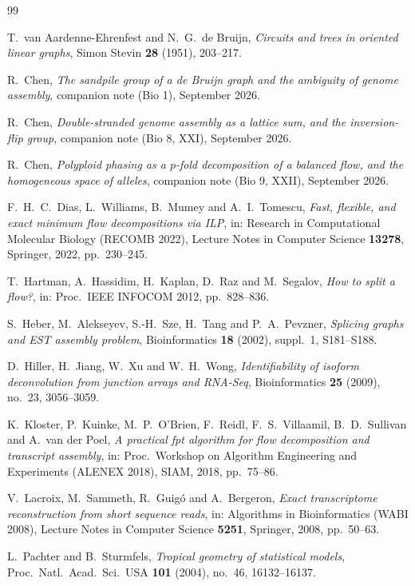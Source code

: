 \documentclass[11pt]{article}
\theoremstyle{plain}
\theoremstyle{definition}
\theoremstyle{remark}
\begin{document}
\begin{thebibliography}{99}

 T.~van Aardenne-Ehrenfest and N.~G.~de Bruijn,
\emph{Circuits and trees in oriented linear graphs},
Simon Stevin \textbf{28} (1951), 203--217.

 R.~Chen, \emph{The sandpile group of a de Bruijn graph and the ambiguity of
genome assembly}, companion note (Bio 1), September 2026.

 R.~Chen, \emph{Double-stranded genome assembly as a lattice sum, and the
inversion-flip group}, companion note (Bio 8, XXI), September 2026.

 R.~Chen, \emph{Polyploid phasing as a $p$-fold decomposition of a balanced
flow, and the homogeneous space of alleles}, companion note (Bio 9, XXII), September 2026.

 F.~H.~C.~Dias, L.~Williams, B.~Mumey and A.~I.~Tomescu,
\emph{Fast, flexible, and exact minimum flow decompositions via ILP},
in: Research in Computational Molecular Biology (RECOMB 2022), Lecture Notes in Computer
Science \textbf{13278}, Springer, 2022, pp.~230--245.

 T.~Hartman, A.~Hassidim, H.~Kaplan, D.~Raz and M.~Segalov,
\emph{How to split a flow?},
in: Proc.\ IEEE INFOCOM 2012, pp.~828--836.

 S.~Heber, M.~Alekseyev, S.-H.~Sze, H.~Tang and P.~A.~Pevzner,
\emph{Splicing graphs and EST assembly problem},
Bioinformatics \textbf{18} (2002), suppl.~1, S181--S188.

 D.~Hiller, H.~Jiang, W.~Xu and W.~H.~Wong,
\emph{Identifiability of isoform deconvolution from junction arrays and RNA-Seq},
Bioinformatics \textbf{25} (2009), no.~23, 3056--3059.

 K.~Kloster, P.~Kuinke, M.~P.~O'Brien, F.~Reidl, F.~S.~Villaamil,
B.~D.~Sullivan and A.~van der Poel,
\emph{A practical fpt algorithm for flow decomposition and transcript assembly},
in: Proc.\ Workshop on Algorithm Engineering and Experiments (ALENEX 2018), SIAM, 2018,
pp.~75--86.

 V.~Lacroix, M.~Sammeth, R.~Guig\'o and A.~Bergeron,
\emph{Exact transcriptome reconstruction from short sequence reads},
in: Algorithms in Bioinformatics (WABI 2008), Lecture Notes in Computer Science
\textbf{5251}, Springer, 2008, pp.~50--63.

 L.~Pachter and B.~Sturmfels,
\emph{Tropical geometry of statistical models},
Proc.\ Natl.\ Acad.\ Sci.\ USA \textbf{101} (2004), no.~46, 16132--16137.


\end{thebibliography}
\end{document}
